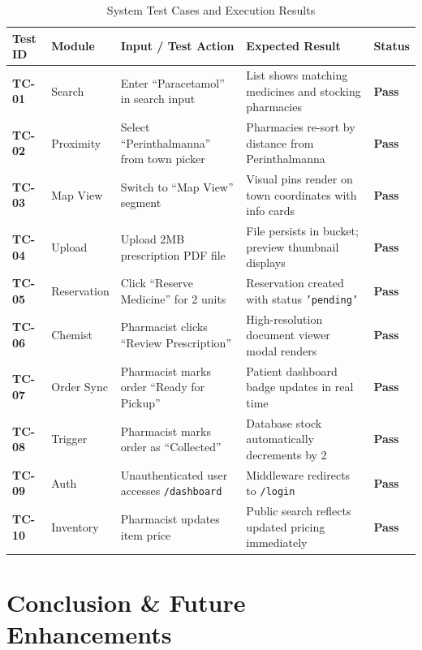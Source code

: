 \documentclass[12pt,a4paper]{report}
\begin{document}
\begin{table}[htbp]
\centering
\caption{System Test Cases and Execution Results}
\label{tab:test_cases}
\begin{tabular}{p{1.4cm}p{2.4cm}p{4.2cm}p{4.5cm}p{1.5cm}}
\toprule
\textbf{Test ID} & \textbf{Module} & \textbf{Input / Test Action} & \textbf{Expected Result} & \textbf{Status} \\
\midrule
\textbf{TC-01} & Search & Enter ``Paracetamol'' in search input & List shows matching medicines and stocking pharmacies & \textbf{Pass} \\
\textbf{TC-02} & Proximity & Select ``Perinthalmanna'' from town picker & Pharmacies re-sort by distance from Perinthalmanna & \textbf{Pass} \\
\textbf{TC-03} & Map View & Switch to ``Map View'' segment & Visual pins render on town coordinates with info cards & \textbf{Pass} \\
\textbf{TC-04} & Upload & Upload 2MB prescription PDF file & File persists in bucket; preview thumbnail displays & \textbf{Pass} \\
\textbf{TC-05} & Reservation & Click ``Reserve Medicine'' for 2 units & Reservation created with status \texttt{'pending'} & \textbf{Pass} \\
\textbf{TC-06} & Chemist & Pharmacist clicks ``Review Prescription'' & High-resolution document viewer modal renders & \textbf{Pass} \\
\textbf{TC-07} & Order Sync & Pharmacist marks order ``Ready for Pickup'' & Patient dashboard badge updates in real time & \textbf{Pass} \\
\textbf{TC-08} & Trigger & Pharmacist marks order as ``Collected'' & Database stock automatically decrements by 2 & \textbf{Pass} \\
\textbf{TC-09} & Auth & Unauthenticated user accesses \texttt{/dashboard} & Middleware redirects to \texttt{/login} & \textbf{Pass} \\
\textbf{TC-10} & Inventory & Pharmacist updates item price & Public search reflects updated pricing immediately & \textbf{Pass} \\
\bottomrule
\end{tabular}
\end{table}

\newpage
\chapter{Conclusion \& Future Enhancements}
\end{document}
